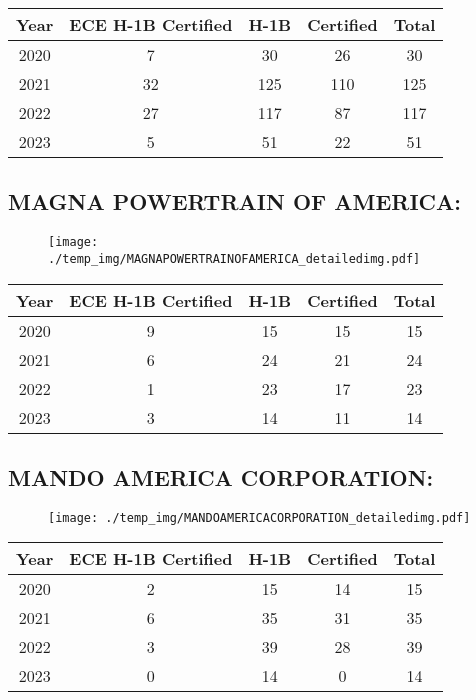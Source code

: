 \documentclass{article}%
\begin{document}
%
\begin{longtable}{c|c|c|c|c}%
\hline%
Year&ECE H{-}1B Certified&H{-}1B&Certified&Total\\%
\hline%
2020&7&30&26&30\\%
\hline%
2021&32&125&110&125\\%
\hline%
2022&27&117&87&117\\%
\hline%
2023&5&51&22&51\\%
\hline%
\end{longtable}

%
\newpage%
\subsection{MAGNA POWERTRAIN OF AMERICA:}%
\label{subsec:MAGNAPOWERTRAINOFAMERICA}%
\label{MAGNAPOWERTRAINOFAMERICAdetailed}%


\begin{figure}[htbp]%
\centering%
\texttt{[image: ./temp\_img/MAGNAPOWERTRAINOFAMERICA\_detailedimg.pdf]}%
\end{figure}

%
\begin{longtable}{c|c|c|c|c}%
\hline%
Year&ECE H{-}1B Certified&H{-}1B&Certified&Total\\%
\hline%
2020&9&15&15&15\\%
\hline%
2021&6&24&21&24\\%
\hline%
2022&1&23&17&23\\%
\hline%
2023&3&14&11&14\\%
\hline%
\end{longtable}

%
\newpage%
\subsection{MANDO AMERICA CORPORATION:}%
\label{subsec:MANDOAMERICACORPORATION}%
\label{MANDOAMERICACORPORATIONdetailed}%


\begin{figure}[htbp]%
\centering%
\texttt{[image: ./temp\_img/MANDOAMERICACORPORATION\_detailedimg.pdf]}%
\end{figure}

%
\begin{longtable}{c|c|c|c|c}%
\hline%
Year&ECE H{-}1B Certified&H{-}1B&Certified&Total\\%
\hline%
2020&2&15&14&15\\%
\hline%
2021&6&35&31&35\\%
\hline%
2022&3&39&28&39\\%
\hline%
2023&0&14&0&14\\%
\hline%
\end{longtable}
\end{document}
